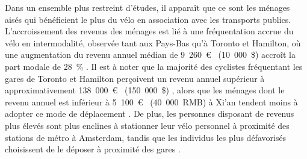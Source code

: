 \begin{refsegment}
Dans un ensemble plus restreint d'études, il apparaît que ce sont les ménages aisés qui bénéficient le plus du vélo en association avec les transports publics. L'accroissement des revenus des ménages est lié à une fréquentation accrue du vélo en intermodalité, observée tant aux Pays-Bas \textcolor{blue}{\autocite[15]{shelat_analysing_2018}} qu'à Toronto et Hamilton, où une augmentation du revenu annuel médian de 9~260~\euro~ (10~000~\$) accroît la part modale de 28~\% \textcolor{blue}{\autocite[2~171]{chan_factors_2020}}. Il est à noter que la majorité des cyclistes fréquentant les gares de Toronto et Hamilton perçoivent un revenu annuel supérieur à approximativement 138~000~\euro~ (150~000~\$) \textcolor{blue}{\autocite[378]{ravensbergen_biking_2018}}, alors que les ménages dont le revenu annuel est inférieur à 5~100~\euro~ (40~000~RMB) à Xi'an tendent moins à adopter ce mode de déplacement \textcolor{blue}{\autocite[172]{yang_bike-and-ride_2014}}. De plus, les personnes disposant de revenus plus élevés sont plus enclines à stationner leur vélo personnel à proximité des stations de métro à Amsterdam, tandis que les individus les plus défavorisés choisissent de le déposer à proximité des gares \textcolor{blue}{\autocite[344]{kampen_bicycle_2021}}.%


\end{refsegment}
